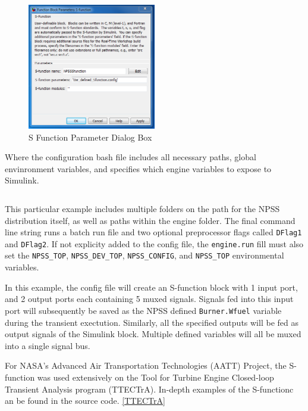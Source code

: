 \documentclass[heading.tex]{subfiles}
\begin{document}
\begin{figure}[H]
\centering
\includegraphics[width=0.5\textwidth]{images/SFuncDialog}
\caption{S Function Parameter Dialog Box}
\label{f:DialogBox}
\end{figure}

Where the configuration bash file includes all necessary paths, global envinronment variables, and specifies
which engine variables to expose to Simulink.

 \begin{adjustwidth}{1cm}{-1cm}
 \inputminted[]{bash}{code/engineConfig.bat}
 \end{adjustwidth} 

This particular example includes multiple folders on the path for the NPSS distribution itself,
as well as paths within the engine folder.
The final command line string runs a batch run file and two optional preprocessor flags called \texttt{DFlag1}
and \texttt{DFlag2}. If not explicity added to the config file, the \texttt{engine.run} fill must also set
the \texttt{NPSS\_TOP}, \texttt{NPSS\_DEV\_TOP}, \texttt{NPSS\_CONFIG}, and \texttt{NPSS\_TOP} environmental variables.

In this example, the config file will create an S-function block with 1 input port,
and 2 output ports each containing 5 muxed signals.
Signals fed into this input port will subsequently be saved as the NPSS defined \texttt{Burner.Wfuel}
variable during the transient exectution. Similarly, all the specified outputs will be fed as output
signals of the Simulink block. Multiple defined variables will all be muxed into a single signal bus.

For NASA's Advanced Air Transportation Technologies (AATT) Project, the S-function was used extensively
on the Tool for Turbine Engine Closed-loop Transient Analysis program (TTECTrA). 
In-depth examples of the S-functionc an be found in the source code. \ref{TTECTrA}
\end{document}
